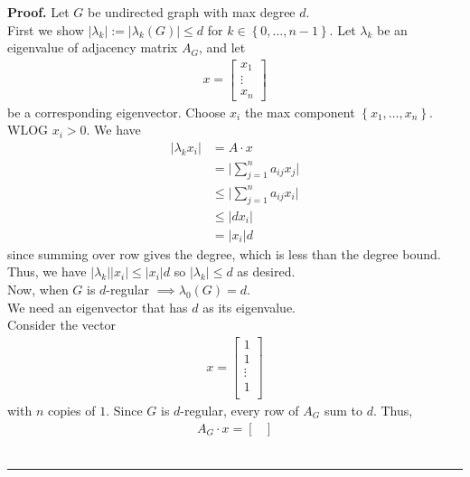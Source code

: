 \documentclass[12pt]{article}
\newenvironment{proof}[1][Proof]{\textbf{#1.} }{\ \rule{0.5em}{0.5em}}
\begin{document}
\begin{proof}
    Let $G$ be undirected graph with max degree $d$.\\
    First we show $\lvert \lambda_k \rvert := \lvert \lambda_k (G) \rvert \leq d$
    for $k \in \left\{ 0, \ldots, n-1 \right\}$.
    Let $\lambda_k$ be an eigenvalue of adjacency matrix 
    $A_G$, and let 
    \begin{align}
        x = 
        \begin{bmatrix}
            x_1\\
            \vdots\\
            x_n
        \end{bmatrix}
    \end{align}
    be a corresponding eigenvector. 
    Choose $x_i$ the max component $\left\{ x_1, \ldots, x_n\right\}$. WLOG $x_i > 0$. 
    We have 
    \begin{align}
        \lvert \lambda_k x_i \rvert &= A \cdot x\\
        &= \lvert \sum^{n}_{j=1} a_{ij}x_j \rvert\\
        &\leq \lvert \sum_{j=1}^{n} a_{ij} x_i \rvert\\
        &\leq \lvert d x_i \rvert \\
        &= \lvert x_i \rvert d
    \end{align}
    since summing over row gives the degree,
    which is less than the degree bound.
    Thus, we have $\lvert \lambda_k \rvert \lvert x_i \rvert \leq \lvert x_i \rvert d$
    so $\lvert \lambda_k \rvert \leq d$ as desired.\\
    Now, when $G$ is $d$-regular $\implies \lambda_0 (G) = d$.\\
    We need an eigenvector that has $d$ as its eigenvalue.\\
    Consider the vector 
    \begin{align}
        x = 
        \begin{bmatrix}
            1\\
            1\\
            \vdots\\
            1\\
        \end{bmatrix}
    \end{align}
    with $n$ copies of $1$.
    Since $G$ is $d$-regular,
    every row of $A_G$ sum to $d$. 
    Thus,
    \begin{align}
        A_G \cdot x =
        \begin{bmatrix}

\end{bmatrix}
\end{align}
\end{proof}
\end{document}
